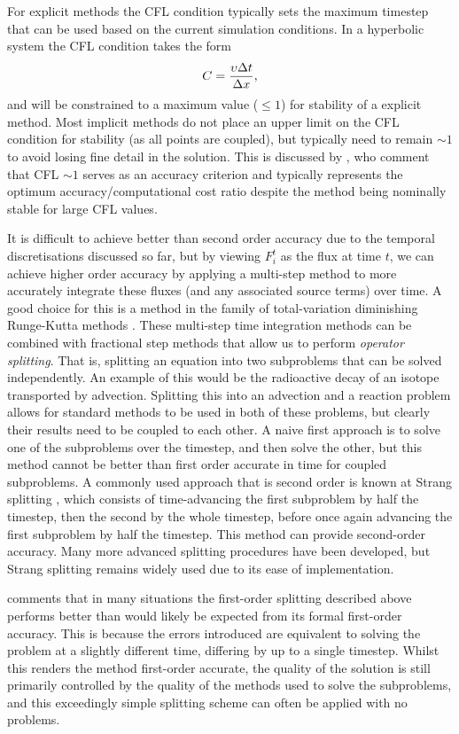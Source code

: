 For explicit methods the CFL condition typically sets the maximum timestep that can be used based on the current simulation conditions.
In a hyperbolic system the CFL condition takes the form
\begin{equation}
    C = \frac{\upsilon\Delta t}{\Delta x},
\end{equation}
and will be constrained to a maximum value ($\leq 1$) for stability of a  explicit method.
Most implicit methods do not place an upper limit on the CFL condition for stability (as all points are coupled), but typically need to remain $\sim 1$ to avoid losing fine detail in the solution.
This is discussed by \citet{Viallet2011}, who comment that CFL $\sim 1$ serves as an accuracy criterion and typically represents the optimum accuracy/computational cost ratio despite the method being nominally stable for large CFL values.

It is difficult to achieve better than second order accuracy due to the temporal discretisations discussed so far, but by viewing $F_i^t$ as the flux at time $t$, we can achieve higher order accuracy by applying a multi-step method to more accurately integrate these fluxes (and any associated source terms) over time.
A good choice for this is a method in the family of total-variation diminishing Runge-Kutta methods \citep[e.g.][]{Shu1988}.
These multi-step time integration methods can be combined with fractional step methods that allow us to perform \emph{operator splitting}.
That is, splitting an equation into two subproblems that can be solved independently.
An example of this would be the radioactive decay of an isotope transported by advection.
Splitting this into an advection and a reaction problem allows for standard methods to be used in both of these problems, but clearly their results need to be coupled to each other.
A naive first approach is to solve one of the subproblems over the timestep, and then solve the other, but this method cannot be better than first order accurate in time for coupled subproblems.
A commonly used approach that is second order is known at Strang splitting \citep{Strang1968}, which consists of time-advancing the first subproblem by half the timestep, then the second by the whole timestep, before once again advancing the first subproblem by half the timestep.
This method can provide second-order accuracy.
Many more advanced splitting procedures have been developed, but Strang splitting remains widely used due to its ease of implementation.

\citet{LeVeque1997} comments that in many situations the first-order splitting described above performs better than would likely be expected from its formal first-order accuracy.
This is because the errors introduced are equivalent to solving the problem at a slightly different time, differing by up to a single timestep.
Whilst this renders the method first-order accurate, the quality of the solution is still primarily controlled by the quality of the methods used to solve the subproblems, and this exceedingly simple splitting scheme can often be applied with no problems.

